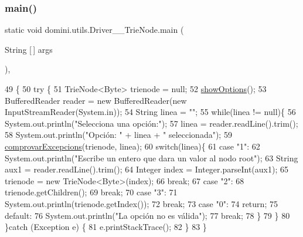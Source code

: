 \subsubsection{\texorpdfstring{main()}{main()}}
{\footnotesize\ttfamily static void domini.\+utils.\+Driver\+\_\+\+\_\+\+Trie\+Node.\+main (\begin{DoxyParamCaption}\item[{String \mbox{[}$\,$\mbox{]}}]{args }\end{DoxyParamCaption})\hspace{0.3cm}{\ttfamily [inline]}, {\ttfamily [static]}}


\begin{DoxyCode}
49                                            \{
50     \textcolor{keywordflow}{try} \{
51         TrieNode<Byte> trienode = null;
52         \hyperlink{classdomini_1_1utils_1_1Driver____TrieNode_ab9e971ebb4f8e219efaab32c6654243a}{showOptions}();
53         BufferedReader reader = \textcolor{keyword}{new} BufferedReader(\textcolor{keyword}{new} InputStreamReader(System.in));
54         String linea = \textcolor{stringliteral}{""};
55         \textcolor{keywordflow}{while}(linea != null)\{
56             System.out.println(\textcolor{stringliteral}{"Selecciona una opción:"});
57             linea = reader.readLine().trim();
58             System.out.println(\textcolor{stringliteral}{"Opción: "} + linea + \textcolor{stringliteral}{" seleccionada"});
59             \hyperlink{classdomini_1_1utils_1_1Driver____TrieNode_aa763a74162f647ee153c5cea01d371d0}{comprovarExcepcions}(trienode, linea);
60             \textcolor{keywordflow}{switch}(linea)\{
61                 \textcolor{keywordflow}{case} \textcolor{stringliteral}{"1"}:
62                     System.out.println(\textcolor{stringliteral}{"Escribe un entero que dara un valor al nodo root"});
63                     String aux1 = reader.readLine().trim();
64                     Integer index = Integer.parseInt(aux1);
65                     trienode = \textcolor{keyword}{new} TrieNode<Byte>(index);
66                 \textcolor{keywordflow}{break};
67                 \textcolor{keywordflow}{case} \textcolor{stringliteral}{"2"}:
68                     trienode.getChildren();
69                 \textcolor{keywordflow}{break};
70                 \textcolor{keywordflow}{case} \textcolor{stringliteral}{"3"}:
71                     System.out.println(trienode.getIndex());
72                 \textcolor{keywordflow}{break};
73                 \textcolor{keywordflow}{case} \textcolor{stringliteral}{"0"}:
74                     \textcolor{keywordflow}{return};
75                 \textcolor{keywordflow}{default}:
76                     System.out.println(\textcolor{stringliteral}{"La opción no es válida"});
77                 \textcolor{keywordflow}{break};
78             \}
79         \}
80     \}\textcolor{keywordflow}{catch} (Exception e) \{
81         e.printStackTrace();
82     \}
83     \}
\end{DoxyCode}
